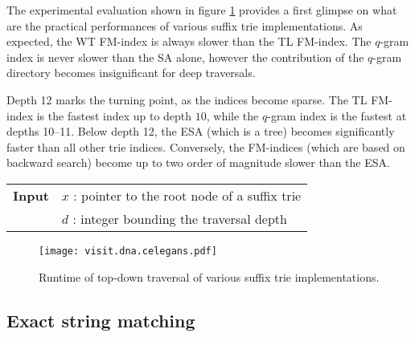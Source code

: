 The experimental evaluation shown in figure \ref{fig:visit-dna} provides a first glimpse on what are the practical performances of various suffix trie implementations.
As expected, the WT FM-index is always slower than the TL FM-index.
The $q$-gram index is never slower than the SA alone, however the contribution of the $q$-gram directory becomes insignificant for deep traversals.

Depth 12 marks the turning point, as the indices become sparse.
The TL FM-index is the fastest index up to depth $10$, while the $q$-gram index is the fastest at depths 10--11.
Below depth 12, the ESA (which is a tree) becomes significantly faster than all other trie indices.
Conversely, the FM-indices (which are based on backward search) become up to two order of magnitude slower than the ESA.

\begin{figure*}[h]
\begin{center}
\begin{minipage}[t]{.7\textwidth}
\begin{algorithm}[H]
\begin{tabular}{ll}
\textbf{Input}  & $x$ : pointer to the root node of a suffix trie\\
 			    & $d$ : integer bounding the traversal depth\\
\end{tabular}
\begin{algorithmic}[1]
		\Repeat
			\State {}
		\Until {}
	\EndIf
\EndIf
\end{algorithmic}
\label{alg:st-dfs}
\end{algorithm}
\end{minipage}
\end{center}
\end{figure*}

\begin{figure}[h!]
\begin{center}
\caption[Top-down traversal runtime]{Runtime of top-down traversal of various suffix trie implementations.}
\label{fig:visit-dna}
\texttt{[image: visit.dna.celegans.pdf]}
\end{center}
\end{figure}

\subsection{Exact string matching}
\label{sec:index:algo:exact}

